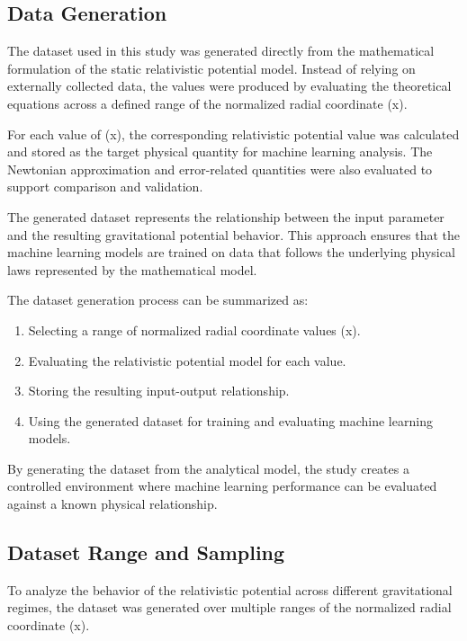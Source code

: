\documentclass[
]{article}
\begin{document}
\subsection{Data Generation}\label{data-generation}

The dataset used in this study was generated directly from the
mathematical formulation of the static relativistic potential model.
Instead of relying on externally collected data, the values were
produced by evaluating the theoretical equations across a defined range
of the normalized radial coordinate (x).

For each value of (x), the corresponding relativistic potential value
was calculated and stored as the target physical quantity for machine
learning analysis. The Newtonian approximation and error-related
quantities were also evaluated to support comparison and validation.

The generated dataset represents the relationship between the input
parameter and the resulting gravitational potential behavior. This
approach ensures that the machine learning models are trained on data
that follows the underlying physical laws represented by the
mathematical model.

The dataset generation process can be summarized as:

\begin{enumerate}
\def\labelenumi{\arabic{enumi}.}
\item
  Selecting a range of normalized radial coordinate values (x).
\item
  Evaluating the relativistic potential model for each value.
\item
  Storing the resulting input-output relationship.
\item
  Using the generated dataset for training and evaluating machine
  learning models.
\end{enumerate}

By generating the dataset from the analytical model, the study creates a
controlled environment where machine learning performance can be
evaluated against a known physical relationship.

\subsection{Dataset Range and Sampling}\label{dataset-range-and-sampling}

To analyze the behavior of the relativistic potential across different
gravitational regimes, the dataset was generated over multiple ranges of
the normalized radial coordinate (x).
\end{document}
